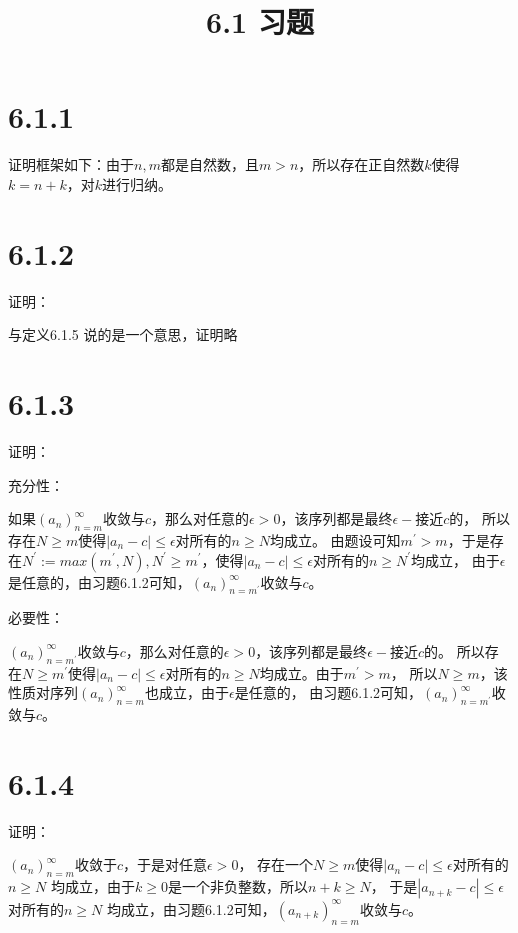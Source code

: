 \documentclass{article}
\theoremstyle{mystyle}
\begin{document}
\title{6.1 习题}
\maketitle

\section*{6.1.1}

证明框架如下：由于$n,m$都是自然数，且$m>n$，所以存在正自然数$k$使得$k = n + k$，对$k$进行归纳。

\section*{6.1.2}

证明：

与定义6.1.5 说的是一个意思，证明略

\section*{6.1.3}

证明：

充分性：

如果$(a_n)_{n=m}^\infty$收敛与$c$，那么对任意的$\epsilon > 0$，该序列都是最终$\epsilon -$接近$c$的，
所以存在$N \geq m$使得$|a_n - c| \leq \epsilon$对所有的$n \geq N$均成立。
由题设可知$m^\prime > m$，于是存在$N^\prime := max(m^\prime, N),N^\prime \geq m^\prime$，使得$|a_n - c| \leq \epsilon$对所有的$n \geq N^\prime$均成立，
由于$\epsilon$是任意的，由习题6.1.2可知，$(a_n)_{n=m^\prime}^\infty$收敛与$c$。

必要性：

$(a_n)_{n=m^\prime}^\infty$收敛与$c$，那么对任意的$\epsilon > 0$，该序列都是最终$\epsilon -$接近$c$的。
所以存在$N \geq m^\prime$使得$|a_n - c| \leq \epsilon$对所有的$n \geq N$均成立。由于$m^\prime > m$，
所以$N \geq m$，该性质对序列$(a_n)_{n=m}^\infty$也成立，由于$\epsilon$是任意的，
由习题6.1.2可知，$(a_n)_{n=m^\prime}^\infty$收敛与$c$。

\section*{6.1.4}

证明：

$(a_n)_{n=m}^\infty$收敛于$c$，于是对任意$\epsilon > 0$，
存在一个$N \geq m$使得$|a_n - c| \leq \epsilon$对所有的$n \geq N$
均成立，由于$k \geq 0$是一个非负整数，所以$n + k \geq N$，
于是$|a_{n+k} - c| \leq \epsilon$对所有的$n \geq N$
均成立，由习题6.1.2可知，$(a_{n+k})_{n=m}^\infty$收敛与$c$。
\end{document}
